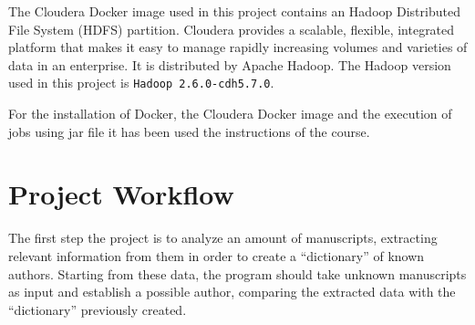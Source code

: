 \documentclass[a4paper, 11pt]{article}
\begin{document}
	\bigskip

	\noindent
	The Cloudera Docker image used in this project contains an Hadoop Distributed File System (HDFS) partition. Cloudera provides a scalable, flexible, integrated platform that makes it easy to manage rapidly increasing volumes and
	varieties of data in an enterprise. It is distributed by Apache Hadoop. The Hadoop version used in this project is \texttt{Hadoop 2.6.0-cdh5.7.0}.

	\bigskip

	\noindent
	For the installation of Docker, the Cloudera Docker image and the execution of jobs using jar file it has been used the instructions of the course.

	\section{Project Workflow}

	The first step the project is to analyze an amount of manuscripts, extracting relevant information from them in order to create a ``dictionary'' of known authors. Starting from these data, the program should take unknown manuscripts as input and establish a possible author, comparing the extracted data with the ``dictionary'' previously created.
\end{document}
